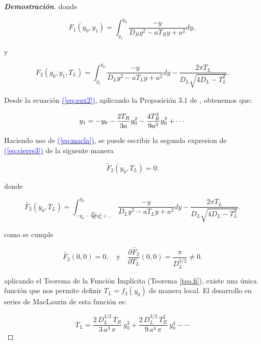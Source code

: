 \documentclass[12pt,a4paper]{report} %
\newcommand{\eref}[1]{\hyperref[#1]{\textcolor{blue}{(\ref*{#1})}}}
\begin{document}
\begin{proof}[\textbf{Demostración}]
	\noindent donde
	
	\begin{equation}
		\label{eq:aux2}
		F_1(y_0,y_1)=\int_{y_1}^{y_0}\frac{-y}{D_Ry^2-aT_Ry+a^2}dy,
	\end{equation}\smallskip
	
	\noindent y
	
	\begin{equation}
		\label{eq:aux1}
		F_2(y_0,y_1,T_L)=\int_{y_1}^{y_0}\frac{-y}{D_Ly^2-aT_Ly+a^2}dy-\frac{2\pi T_L}{D_L\sqrt{4D_L-T_L^2}}.
	\end{equation}\smallskip
	
	\noindent Desde la ecuación \eref{eq:aux2}, aplicando la Proposición 3.1 de \cite{properties}, obtenemos que:
	
		\begin{equation}
		\label{eq:macla}
		\scalebox{1}{$\displaystyle
			y_1=-y_0-\frac{2T_R}{3a}y_0^2-\frac{4T_R^2}{9a^2}y_0^3+\cdots
			$}
	\end{equation}\smallskip
	
	\noindent Haciendo uso de \eref{eq:macla}, se puede escribir la segunda expresion de \eref{eq:cierre3} de la siguente manera
	
	\begin{equation}
		\label{eq:f1nuevo}
		\tilde{F}_2(y_0,T_L)=0.
	\end{equation}\smallskip
	
	\noindent donde
	
	\begin{equation}
		\label{eq:macla2}
				\tilde{F_2}(y_0,T_L)=\int_{-y_0-\frac{2T_R}{3a}y_0^2+...}^{y_0}\frac{-y}{D_Ly^2-aT_Ly+a^2}dy-\frac{2\pi T_L}{D_L\sqrt{4D_L-T_L^2}}.
	\end{equation}\smallskip

	\noindent como se cumple
	
	\begin{equation}
		\label{dpar}
		\tilde{F_2}(0,0)=0, \quad \text{y}\quad\frac{\partial \tilde{F_2}}{\partial T_L}(0,0)=\frac{\pi}{D_L^{3/2}}\neq0.
	\end{equation}\smallskip
	
	\noindent aplicando el Teorema de la Función Implícita (Teorema \ref{teo.fi}), existe una única función que nos permite definir $T_L=f_2(y_0)$ de manera local. El desarrollo en series de MacLaurin de esta función es:
	
	\begin{equation}
		\label{macla3}
		T_L=\frac{2\, D_L^{3/2}\, T_R}{3\, a^3 \, \pi}\: y_0^3+\frac{2\, D_L^{3/2}\, T_R^2}{9\, a^4 \, \pi}\: y_0^4-\cdots
	\end{equation}\smallskip
	

\end{proof}
\end{document}
